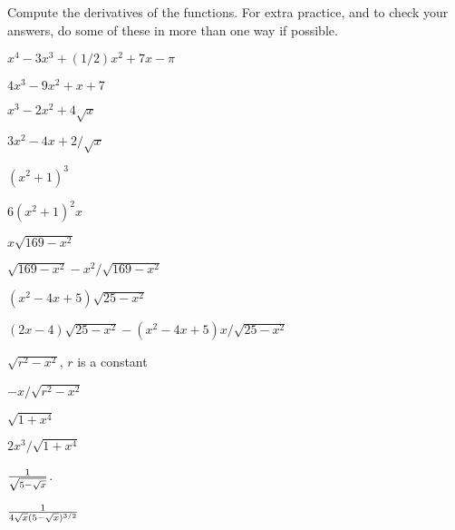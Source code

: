 \begin{exercises}

\noindent Compute the derivatives of the functions. For extra practice, and to
check your answers, do some of these in more than one way if possible.

\twocol

\begin{exercise} $x^4-3x^3+(1/2)x^2+7x-\pi$
\begin{answer} $4x^3-9x^2+x+7$
\end{answer}\end{exercise}

\begin{exercise} $x^3-2x^2+4\sqrt{x}$
\begin{answer} $3x^2-4x+2/\sqrt{x}$
\end{answer}\end{exercise}

\begin{exercise} $(x^2+1)^3$
\begin{answer} $6(x^2+1)^2x$
\end{answer}\end{exercise}

\begin{exercise} $x\sqrt{169-x^2}$
\begin{answer} $\sqrt{169-x^2}-x^2/\sqrt{169-x^2}$
\end{answer}\end{exercise}

\begin{exercise} $(x^2-4x+5)\sqrt{25-x^2}$
\begin{answer} $ (2x-4)\sqrt{25-x^2}-$\hfill\break$(x^2-4x+5)x/\sqrt{25-x^2}$
\end{answer}\end{exercise}

\begin{exercise} $\sqrt{r^2-x^2}$, $r$ is a constant
\begin{answer} $-x/\sqrt{r^2-x^2}$
\end{answer}\end{exercise}

\begin{exercise} $\sqrt{1+x^4}$
\begin{answer} $2x^3/\sqrt{1+x^4}$
\end{answer}\end{exercise}

\begin{exercise} ${1\over\sqrt{5-\sqrt{x}}}$.
\begin{answer} ${1\over 4\sqrt{x}(5-\sqrt{x})^{3/2}}$
\end{answer}\end{exercise}


\end{exercises}
